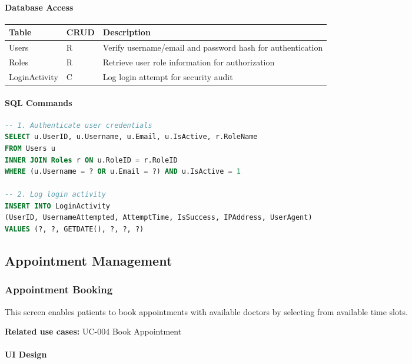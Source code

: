 \documentclass[12pt,a4paper]{article}
\begin{document}
\paragraph{Database Access}

\begin{longtable}{|p{3cm}|p{2cm}|p{9cm}|}
\hline
\textbf{Table} & \textbf{CRUD} & \textbf{Description} \\
\hline
Users & R & Verify username/email and password hash for authentication \\
\hline
Roles & R & Retrieve user role information for authorization \\
\hline
LoginActivity & C & Log login attempt for security audit \\
\hline
\end{longtable}

\paragraph{SQL Commands}

\begin{lstlisting}[language=SQL]
-- 1. Authenticate user credentials
SELECT u.UserID, u.Username, u.Email, u.IsActive, r.RoleName
FROM Users u 
INNER JOIN Roles r ON u.RoleID = r.RoleID
WHERE (u.Username = ? OR u.Email = ?) AND u.IsActive = 1

-- 2. Log login activity
INSERT INTO LoginActivity 
(UserID, UsernameAttempted, AttemptTime, IsSuccess, IPAddress, UserAgent)
VALUES (?, ?, GETDATE(), ?, ?, ?)
\end{lstlisting}

\subsection{Appointment Management}

\subsubsection{Appointment Booking}

This screen enables patients to book appointments with available doctors by selecting from available time slots.

\textbf{Related use cases:} UC-004 Book Appointment

\paragraph{UI Design}
\end{document}

